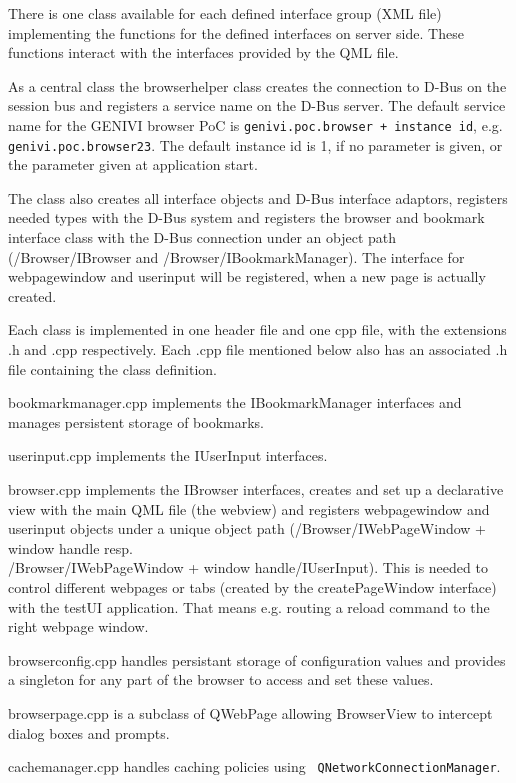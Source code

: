 \documentclass{pelagicore}
\begin{document}
There is one class available for each defined interface group (XML file)
implementing the functions for the defined interfaces on server side. These
functions interact with the interfaces provided by the QML file.

As a central class the browserhelper class creates the connection to D-Bus on
the session bus and registers a service name on the D-Bus server. The default
service name for the GENIVI browser PoC is {\tt genivi.poc.browser + instance
id}, e.g. {\tt genivi.poc.browser23}. The default instance id is 1, if no
parameter is given, or the parameter given at application start.

The class also creates all interface objects and D-Bus interface adaptors,
registers needed types with the D-Bus system and registers the browser and
bookmark interface class with the D-Bus connection under an object path
(/Browser/IBrowser and /Browser/IBookmarkManager). The interface for
webpagewindow and userinput will be registered, when a new page is actually
created.

Each class is implemented in one header file and one cpp file, with the
extensions .h and .cpp respectively. Each .cpp file mentioned below also has an
associated .h file containing the class definition.

bookmarkmanager.cpp implements the IBookmarkManager interfaces and manages
persistent storage of bookmarks.

userinput.cpp implements the IUserInput interfaces.

browser.cpp implements the IBrowser interfaces, creates and set up a
declarative view with the main QML file (the webview) and registers
webpagewindow and userinput objects under a unique object path
(/Browser/IWebPageWindow + window handle resp. \\/Browser/IWebPageWindow + window
handle/IUserInput). This is needed to control different webpages or tabs
(created by the createPageWindow interface) with the testUI application. That
means e.g. routing a reload command to the right webpage window.

browserconfig.cpp handles persistant storage of configuration values and
provides a singleton for any part of the browser to access and set these
values.

browserpage.cpp is a subclass of QWebPage allowing BrowserView to intercept
dialog boxes and prompts.

cachemanager.cpp handles caching policies using {\tt
QNetworkConnectionManager}.
\end{document}
